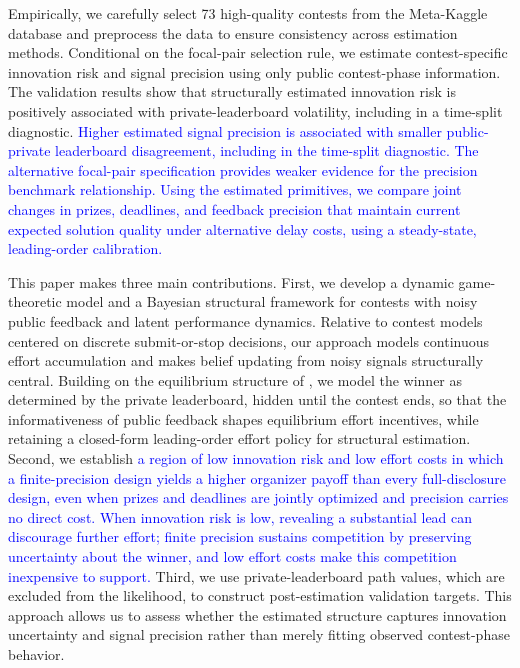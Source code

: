 \documentclass[mnsc]{informs3}
\begin{document}
Empirically, we carefully select 73 high-quality contests from the Meta-Kaggle database and preprocess the data to ensure consistency across estimation methods.
Conditional on the focal-pair selection rule, we estimate contest-specific innovation risk and signal precision using only public contest-phase information.
The validation results show that structurally estimated innovation risk is positively associated with private-leaderboard volatility, including in a time-split diagnostic.
\textcolor{blue}{Higher estimated signal precision is associated with smaller public-private leaderboard disagreement, including in the time-split diagnostic. The alternative focal-pair specification provides weaker evidence for the precision benchmark relationship.}
\textcolor{blue}{Using the estimated primitives, we compare joint changes in prizes, deadlines, and feedback precision that maintain current expected solution quality under alternative delay costs, using a steady-state, leading-order calibration.}


This paper makes three main contributions.
First, we develop a dynamic game-theoretic model and a Bayesian structural framework for contests with noisy public feedback and latent performance dynamics.
Relative to contest models centered on discrete submit-or-stop decisions, our approach models continuous effort accumulation and makes belief updating from noisy signals structurally central.
Building on the equilibrium structure of \citet{Ryvkin2022Fight}, we model the winner as determined by the private leaderboard, hidden until the contest ends, so that the informativeness of public feedback shapes equilibrium effort incentives, while retaining a closed-form leading-order effort policy for structural estimation.
Second, we establish \textcolor{blue}{a region of low innovation risk and low effort costs in which a finite-precision design yields a higher organizer payoff than every full-disclosure design, even when prizes and deadlines are jointly optimized and precision carries no direct cost. When innovation risk is low, revealing a substantial lead can discourage further effort; finite precision sustains competition by preserving uncertainty about the winner, and low effort costs make this competition inexpensive to support.}
Third, we use private-leaderboard path values, which are excluded from the likelihood, to construct post-estimation validation targets.
This approach allows us to assess whether the estimated structure captures innovation uncertainty and signal precision rather than merely fitting observed contest-phase behavior.
\end{document}
